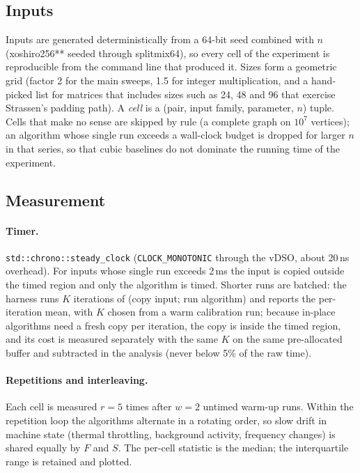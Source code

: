 \subsection{Inputs}
Inputs are generated deterministically from a 64-bit seed combined with $n$
(xoshiro256** seeded through splitmix64), so every cell of the experiment is
reproducible from the command line that produced it. Sizes form a geometric
grid (factor 2 for the main sweeps, 1.5 for integer multiplication, and a
hand-picked list for matrices that includes sizes such as 24, 48 and 96 that
exercise Strassen's padding path). A \emph{cell} is a (pair, input family,
parameter, $n$) tuple. Cells that make no sense are skipped by rule (a complete
graph on $10^7$ vertices); an algorithm whose single run exceeds a wall-clock
budget is dropped for larger $n$ in that series, so that cubic baselines do not
dominate the running time of the experiment.

\subsection{Measurement}
\paragraph{Timer.} \texttt{std::chrono::steady\_clock} (\texttt{CLOCK\_MONOTONIC}
through the vDSO, about 20\,ns overhead). For inputs whose single run exceeds
2\,ms the input is copied outside the timed region and only the algorithm is
timed. Shorter runs are batched: the harness runs $K$ iterations of (copy
input; run algorithm) and reports the per-iteration mean, with $K$ chosen from
a warm calibration run; because in-place algorithms need a fresh copy per
iteration, the copy is inside the timed region, and its cost is measured
separately with the same $K$ on the same pre-allocated buffer and subtracted
in the analysis (never below 5\% of the raw time).

\paragraph{Repetitions and interleaving.} Each cell is measured $r=5$ times
after $w=2$ untimed warm-up runs. Within the repetition loop the algorithms
alternate in a rotating order, so slow drift in machine state (thermal
throttling, background activity, frequency changes) is shared equally by $F$
and $S$. The per-cell statistic is the median; the interquartile range is
retained and plotted.

